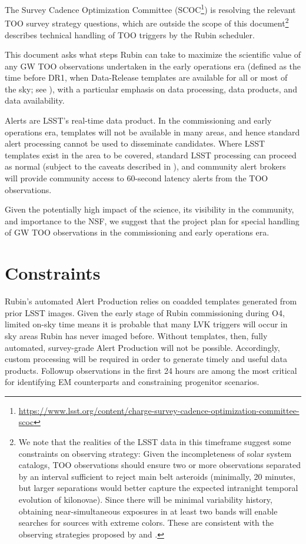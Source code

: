 \documentclass[DM,authoryear,toc]{lsstdoc}
\begin{document}
The Survey Cadence Optimization Committee (SCOC\footnote{\url{https://www.lsst.org/content/charge-survey-cadence-optimization-committee-scoc}}) is resolving the relevant TOO survey strategy questions, which are outside the scope of this document\footnote{We note that the realities of the LSST data in this timeframe suggest some constraints on observing strategy:
Given the incompleteness of solar system catalogs, TOO observations should ensure two or more observations separated by an interval sufficient to reject main belt asteroids (minimally, 20 minutes, but larger separations would better capture the expected intranight temporal evolution of kilonovae).
Since there will be minimal variability history, obtaining near-simultaneous exposures in at least two bands will enable searches for sources with extreme colors.
These are consistent with the observing strategies proposed by \citet{2018arXiv181204051M} and \citet{2022ApJS..260...18A}.}
 describes technical handling of TOO triggers by the Rubin scheduler.

This document asks what steps Rubin can take to maximize the scientific value of any GW TOO observations undertaken in the early operations era (defined as the time before DR1, when Data-Release templates are available for all or most of the sky; see ), with a particular emphasis on data processing, data products, and data availability.

Alerts are LSST's real-time data product.
In the commissioning and early operations era,
templates will not be available in many areas, and hence standard alert processing cannot be used to disseminate candidates.
Where LSST templates exist in the area to be covered, standard LSST processing can proceed as normal (subject to the caveats described in ), and community alert brokers will provide community access to 60-second latency alerts from the TOO observations.

Given the potentially high impact of the science, its visibility in the community, and importance to the NSF, we suggest that the project plan for special handling of GW TOO observations in the commissioning and early operations era.

\section{Constraints} \label{sec:constraints}

Rubin's automated Alert Production relies on coadded templates generated from prior LSST images.
Given the early stage of Rubin commissioning during O4, limited on-sky time means it is probable that many LVK triggers will occur in sky areas Rubin has never imaged before.
Without templates, then, fully automated, survey-grade Alert Production will not be possible.
Accordingly, custom processing will be required in order to generate timely and useful data products.
Followup observations in the first 24 hours are among the most critical for identifying EM counterparts and constraining progenitor scenarios.
\end{document}
